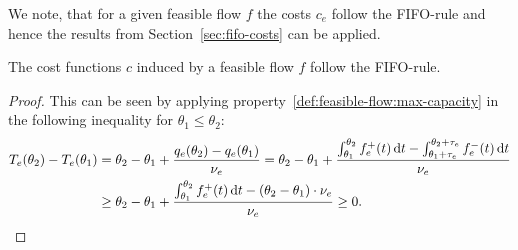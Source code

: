 We note, that for a given feasible flow $f$ the costs $c_e$ follow the FIFO-rule and hence the results from Section~\ref{sec:fifo-costs} can be applied.
\begin{proposition}
    The cost functions $c$ induced by a feasible flow $f$ follow the FIFO-rule.
\end{proposition}
\begin{proof}
    This can be seen by applying property~\ref{def:feasible-flow:max-capacity} in the following inequality for $\theta_1\leq \theta_2$:
    \begin{align*}
        T_e(\theta_2) - T_e(\theta_1)
        &= \theta_2 - \theta_1 + \frac{q_e(\theta_2) - q_e(\theta_1)}{\nu_e}
        = \theta_2 - \theta_1 + \frac{\int_{\theta_1}^{\theta_2}f_e^+(t)\,\textnormal{d} t - \int_{\theta_1 + \tau_e}^{\theta_2 + \tau_e} f_e^-(t) \,\textnormal{d} t}{\nu_e}\\
        &\geq \theta_2 - \theta_1 + \frac{\int_{\theta_1}^{\theta_2} {f}^+_e(t)\,\textnormal{d} t - (\theta_2 - \theta_1)\cdot \nu_e}{\nu_e} \geq 0.
    \end{align*}
\end{proof}
